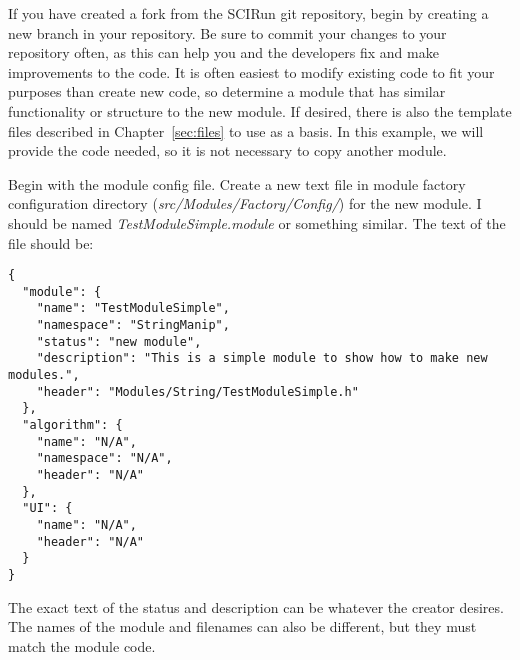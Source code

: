 \documentclass[fleqn,11pt,openany]{book}
\begin{document}
If you have created a fork from the SCIRun git repository, begin by creating a new branch in your repository.  
Be sure to commit your changes to your repository often, as this can help you and the developers fix and make improvements to the code.
It is often easiest to modify existing code to fit your purposes than create new code, so determine a module that has similar functionality or structure to the new module.  
If desired, there is also the template files described in Chapter~\ref{sec:files} to use as a basis.  
In this example, we will provide the code needed, so it is not necessary to copy another module.  


Begin with the module config file.  
Create a new text file in module factory configuration directory (\emph{src/Modules/Factory/Config/}) for the new module.  
I should be named \emph{TestModuleSimple.module} or something similar.  
The text of the file should be:
\begin{verbatim}
{
  "module": {
    "name": "TestModuleSimple",
    "namespace": "StringManip",
    "status": "new module",
    "description": "This is a simple module to show how to make new modules.",
    "header": "Modules/String/TestModuleSimple.h"
  },
  "algorithm": {
    "name": "N/A",
    "namespace": "N/A",
    "header": "N/A"
  },
  "UI": {
    "name": "N/A",
    "header": "N/A"
  }
}
\end{verbatim}
The exact text of the status and description can be whatever the creator desires. 
The names of the module and filenames can also be different, but they must match the module code.  
\end{document}
